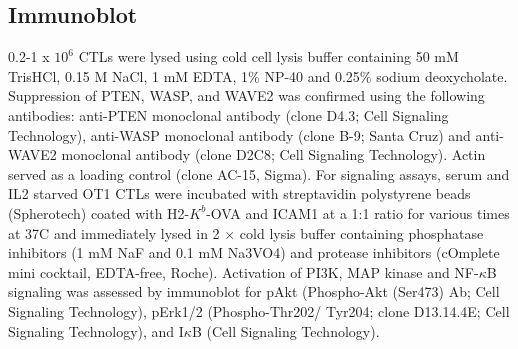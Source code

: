 \subsection{Immunoblot}
0.2-1 x $10^{6}$ CTLs were lysed using cold cell lysis buffer containing 50 mM TrisHCl, 0.15 M NaCl, 1 mM EDTA, 1\% NP-40 and 0.25\% sodium deoxycholate. Suppression of PTEN, WASP, and WAVE2 was confirmed using the following antibodies: anti-PTEN monoclonal antibody (clone D4.3; Cell Signaling Technology), anti-WASP monoclonal antibody (clone B-9; Santa Cruz) and anti-WAVE2 monoclonal antibody (clone D2C8; Cell Signaling Technology). Actin served as a loading control (clone AC-15, Sigma). For signaling assays, serum and IL2 starved OT1 CTLs were incubated with streptavidin polystyrene beads (Spherotech) coated with H2-$K^{b}$-OVA and ICAM1 at a 1:1 ratio for various times at 37\degree C and immediately lysed in 2 × cold lysis buffer containing phosphatase inhibitors (1 mM NaF and 0.1 mM Na3VO4) and protease inhibitors (cOmplete mini cocktail, EDTA-free, Roche). Activation of PI3K, MAP kinase and NF-$\kappa$B signaling was assessed by immunoblot for pAkt (Phospho-Akt (Ser473) Ab; Cell Signaling Technology), pErk1/2 (Phospho-Thr202/ Tyr204; clone D13.14.4E; Cell Signaling Technology), and I$\kappa$B (Cell Signaling Technology).
